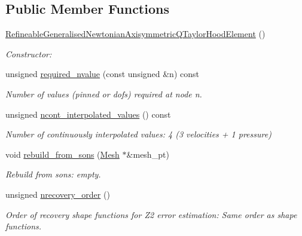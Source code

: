 \subsection*{Public Member Functions}
\begin{DoxyCompactItemize}
\item 
\hyperlink{classoomph_1_1RefineableGeneralisedNewtonianAxisymmetricQTaylorHoodElement_a3de4a151291752fa38aa30663bd0695c}{Refineable\+Generalised\+Newtonian\+Axisymmetric\+Q\+Taylor\+Hood\+Element} ()
\begin{DoxyCompactList}\small\item\em Constructor\+: \end{DoxyCompactList}\item 
unsigned \hyperlink{classoomph_1_1RefineableGeneralisedNewtonianAxisymmetricQTaylorHoodElement_a02c6caa8509c6d227ef9ca4e3a53d5ea}{required\+\_\+nvalue} (const unsigned \&n) const
\begin{DoxyCompactList}\small\item\em Number of values (pinned or dofs) required at node n. \end{DoxyCompactList}\item 
unsigned \hyperlink{classoomph_1_1RefineableGeneralisedNewtonianAxisymmetricQTaylorHoodElement_a9c1262e9d7ec08866b86214da5730f3c}{ncont\+\_\+interpolated\+\_\+values} () const
\begin{DoxyCompactList}\small\item\em Number of continuously interpolated values\+: 4 (3 velocities + 1 pressure) \end{DoxyCompactList}\item 
void \hyperlink{classoomph_1_1RefineableGeneralisedNewtonianAxisymmetricQTaylorHoodElement_ac380d6d9f19c115743fd5234ab5b8b6c}{rebuild\+\_\+from\+\_\+sons} (\hyperlink{classoomph_1_1Mesh}{Mesh} $\ast$\&mesh\+\_\+pt)
\begin{DoxyCompactList}\small\item\em Rebuild from sons\+: empty. \end{DoxyCompactList}\item 
unsigned \hyperlink{classoomph_1_1RefineableGeneralisedNewtonianAxisymmetricQTaylorHoodElement_af121fcf019006367505c47ba8c071c8e}{nrecovery\+\_\+order} ()
\begin{DoxyCompactList}\small\item\em Order of recovery shape functions for Z2 error estimation\+: Same order as shape functions. \end{DoxyCompactList}\item 

\end{DoxyCompactItemize}
